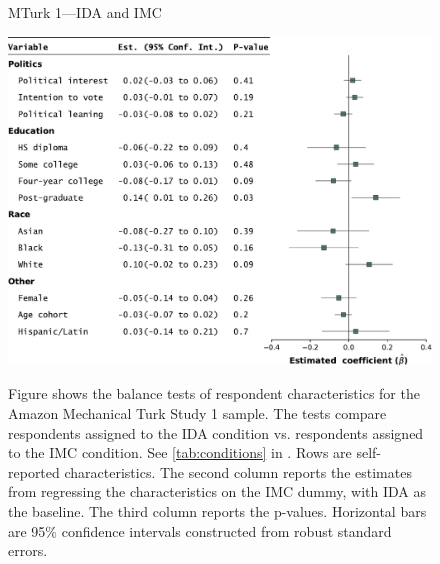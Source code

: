 \begin{center}
	\begin{figure}
		\centering
		\caption{MTurk 1---IDA and IMC}
		\includegraphics[width=\textwidth]{../figs/study1-baltest-14k-ips.pdf}
		\label{fig:baltest-14k-ips}
		\caption*{\footnotesize 
			Figure shows the balance tests of respondent characteristics for the Amazon Mechanical Turk Study 1 sample.
			The tests compare respondents assigned to the IDA condition vs. respondents assigned to the IMC condition.
			See \cref{tab:conditions} in .
			Rows are self-reported characteristics.
			The second column reports the estimates from regressing the characteristics on the IMC dummy, with IDA as the baseline.
			The third column reports the p-values.
			Horizontal bars are 95\% confidence intervals constructed from robust standard errors.
		}
	\end{figure}
\end{center}

